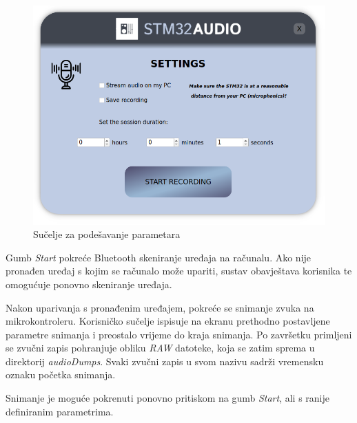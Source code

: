 \begin{figure}[ht]
	\includegraphics[width=\linewidth]{imgs/params_form}
	\caption{Sučelje za podešavanje parametara}
	\label{fig:params_form}
\end{figure}

Gumb \textit{Start} pokreće Bluetooth skeniranje uređaja na računalu. Ako nije pronađen uređaj s kojim se računalo može upariti, sustav obavještava korisnika te omogućuje ponovno skeniranje uređaja. 

Nakon uparivanja s pronađenim uređajem, pokreće se snimanje zvuka na mikrokontroleru. Korisničko sučelje ispisuje na ekranu prethodno postavljene parametre snimanja i preostalo vrijeme do kraja snimanja. Po završetku primljeni se zvučni zapis pohranjuje obliku \textit{RAW} datoteke, koja se zatim sprema u direktorij \textit{audioDumps}. Svaki zvučni zapis u svom nazivu sadrži vremensku oznaku početka snimanja. 

Snimanje je moguće pokrenuti ponovno pritiskom na gumb \textit{Start}, ali s ranije definiranim parametrima.

\vspace*{3\baselineskip}
 
